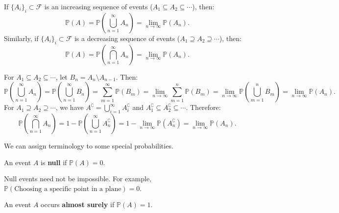 \documentclass{huhtakm-template-book-v2}
\newcommand{\prob}{\mathbb{P}}
\begin{document}
    \begin{lem}
        \label{Chapter 2 (Lemma) Continuity of Probability Measure}
        If $\{A_{i}\}_{i}\subset\mathcal{F}$ is an increasing sequence of events ($A_{1}\subseteq A_{2}\subseteq\cdots$), then:
        \begin{equation*}
            \prob(A) = \prob\left(\bigcup_{n = 1}^{\infty}A_{n}\right) = \lim_{n \to \infty}\prob(A_{n}).
        \end{equation*}
        Similarly, if $\{A_{i}\}_{i}\subset\mathcal{F}$ is a decreasing sequence of events ($A_{1}\supseteq A_{2}\supseteq\cdots$), then:
        \begin{equation*}
            \prob(A) = \prob\left(\bigcap_{n = 1}^{\infty}A_{n}\right) = \lim_{n \to \infty}\prob(A_{n}).
        \end{equation*}
    \end{lem}
    \begin{proofing}
        For $A_{1}\subseteq A_{2}\subseteq\cdots$, let $B_{n} = A_{n}\setminus A_{n-1}$. Then:
        \begin{equation*}
            \prob\left(\bigcup_{n = 1}^{\infty}A_{n}\right) = \prob\left(\bigcup_{n = 1}^{\infty}B_{n}\right) = \sum_{m = 1}^{\infty}\prob(B_{m}) = \lim_{n \to \infty}\sum_{m = 1}^{n}\prob(B_{m}) = \lim_{n \to \infty}\prob\left(\bigcup_{m = 1}^{n}B_{m}\right) = \lim_{n \to \infty}\prob(A_{n}).
        \end{equation*}
        For $A_{1}\supseteq A_{2}\supseteq\cdots$, we have $A^{\complement} = \bigcup_{i = 1}^{\infty}A_{i}^{\complement}$ and $A_{1}^{\complement}\subseteq A_{2}^{\complement}\subseteq\cdots$. Therefore:
        \begin{equation*}
            \prob\left(\bigcap_{n = 1}^{\infty}A_{n}\right) = 1-\prob\left(\bigcup_{n = 1}^{\infty}A_{n}^{\complement}\right) = 1-\lim_{n \to \infty}\prob(A_{n}^{\complement}) = \lim_{n \to \infty}\prob(A_{n}).
        \end{equation*}
    \end{proofing}
    We can assign terminology to some special probabilities.
    \begin{defn}
        An event $A$ is \textbf{null} if $\prob(A) = 0$.
    \end{defn}
    \begin{rem}
        Null events need not be impossible. For example, $\prob(\text{Choosing a specific point in a plane}) = 0$.
    \end{rem}
    \begin{defn}
        An event $A$ occurs \textbf{almost surely} if $\prob(A) = 1$.
    \end{defn}
    \newpage
\end{document}
